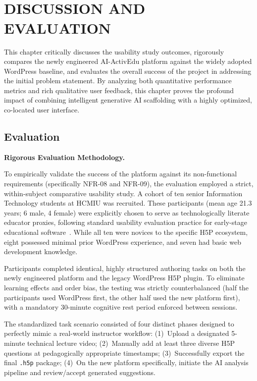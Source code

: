 \chapter{\\
DISCUSSION AND EVALUATION}

This chapter critically discusses the usability study outcomes, rigorously compares the newly engineered AI-ActivEdu platform against the widely adopted WordPress baseline, and evaluates the overall success of the project in addressing the initial problem statement. By analyzing both quantitative performance metrics and rich qualitative user feedback, this chapter proves the profound impact of combining intelligent generative AI scaffolding with a highly optimized, co-located user interface.

\section{Evaluation}

\textbf{Rigorous Evaluation Methodology.}

To empirically validate the success of the platform against its non-functional requirements (specifically NFR-08 and NFR-09), the evaluation employed a strict, within-subject comparative usability study. A cohort of ten senior Information Technology students at HCMIU was recruited. These participants (mean age 21.3 years; 6 male, 4 female) were explicitly chosen to serve as technologically literate educator proxies, following standard usability evaluation practice for early-stage educational software~\cite{sommerville2016}. While all ten were novices to the specific H5P ecosystem, eight possessed minimal prior WordPress experience, and seven had basic web development knowledge.

Participants completed identical, highly structured authoring tasks on both the newly engineered platform and the legacy WordPress H5P plugin. To eliminate learning effects and order bias, the testing was strictly counterbalanced (half the participants used WordPress first, the other half used the new platform first), with a mandatory 30-minute cognitive rest period enforced between sessions.

The standardized task scenario consisted of four distinct phases designed to perfectly mimic a real-world instructor workflow: 
(1)~Upload a designated 5-minute technical lecture video; 
(2)~Manually add at least three diverse H5P questions at pedagogically appropriate timestamps; 
(3)~Successfully export the final \texttt{.h5p} package; 
(4)~On the new platform specifically, initiate the AI analysis pipeline and review/accept generated suggestions.

